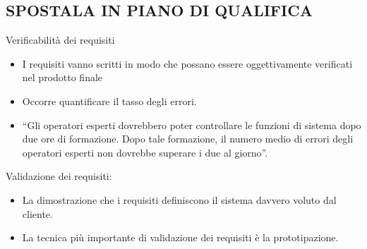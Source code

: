 \subsection{SPOSTALA IN PIANO DI QUALIFICA}

Verificabilità dei requisiti
    \begin{itemize}
    	\item I requisiti vanno scritti in modo che possano essere
    oggettivamente verificati nel prodotto finale
        \item Occorre quantificare il tasso degli errori.
        \item “Gli operatori esperti dovrebbero poter controllare le
    funzioni di sistema dopo due ore di formazione. Dopo tale formazione, il numero medio di errori degli operatori esperti non dovrebbe superare i due al giorno”.
    \end{itemize}
    
    Validazione dei requisiti:
    \begin{itemize}
        \item La dimostrazione che i requisiti definiscono il
    sistema davvero voluto dal cliente.
        \item La tecnica più importante di validazione dei
    requisiti è la prototipazione.
    \end{itemize}

